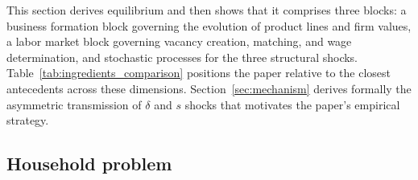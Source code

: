 \documentclass[authoryear, review, 12pt]{elsarticle}
\begin{document}
	This section derives equilibrium and then shows that it comprises three blocks: a 
	business formation block governing the evolution of product lines 
	and firm values, a labor market block governing vacancy creation, 
	matching, and wage determination, and stochastic processes for 
	the three structural shocks. Table~\ref{tab:ingredients_comparison} 
	positions the paper relative to the closest antecedents across these dimensions. Section~\ref{sec:mechanism} derives 
	formally the asymmetric transmission of $\delta$ and $s$ shocks 
	that motivates the paper's empirical strategy.
	
	
	
	\subsection{Household problem}
	
\end{document}
